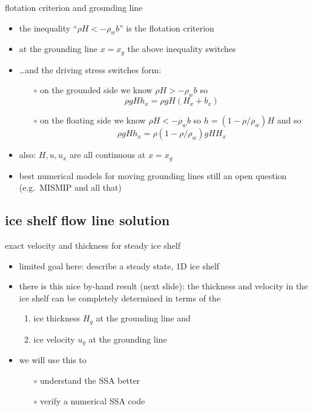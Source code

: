 \begin{frame}{flotation criterion and grounding line}

\begin{itemize}
\item the inequality ``$\rho H < - \rho_w b$'' is the \alert{flotation criterion}
\item at the grounding line $x=x_g$ the above inequality switches
\item \dots and the driving stress switches form:
  \begin{itemize}
  \item[$\circ$] on the grounded side we know $\rho H > - \rho_w b$ so
  	$$\rho g H h_x = \rho g H (H_x + b_x)$$
  \item[$\circ$] on the floating side we know $\rho H < - \rho_w b$ so $h = (1-\rho/\rho_w) H$ and so
  	$$\rho g H h_x = \rho(1-\rho/\rho_w) g H H_x$$
  \end{itemize}
\item also: $H,u,u_x$ are all continuous at $x=x_g$
\item best numerical models for moving grounding lines still an open question (e.g.~MISMIP and all that)
\end{itemize}
\end{frame}



\subsection{ice shelf flow line solution}


\begin{frame}{exact velocity and thickness for steady ice shelf}

\begin{itemize}
\item limited goal here: describe a steady state, 1D ice shelf
\item there is this nice \alert{by-hand} result (next slide): the thickness and velocity in the ice shelf can be completely determined in terms of the 
  \begin{enumerate}
  \item ice thickness $H_g$ at the grounding line and
  \item ice velocity $u_g$ at the grounding line
  \end{enumerate}
\item we will use this to
  \begin{itemize}
  \item[$\circ$] understand the SSA better
  \item[$\circ$] verify a numerical SSA code
  \end{itemize}
\end{itemize}
\end{frame}


